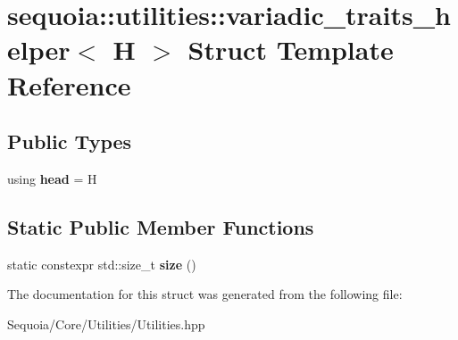 \hypertarget{structsequoia_1_1utilities_1_1variadic__traits__helper_3_01_h_01_4}{}\section{sequoia\+::utilities\+::variadic\+\_\+traits\+\_\+helper$<$ H $>$ Struct Template Reference}
\label{structsequoia_1_1utilities_1_1variadic__traits__helper_3_01_h_01_4}
\subsection*{Public Types}
\begin{DoxyCompactItemize}
\item 
\mbox{\label{structsequoia_1_1utilities_1_1variadic__traits__helper_3_01_h_01_4_a64f4c7c02872760d5f56bbcd8e4eb855}} 
using {\bfseries head} = H
\end{DoxyCompactItemize}
\subsection*{Static Public Member Functions}
\begin{DoxyCompactItemize}
\item 
\mbox{\label{structsequoia_1_1utilities_1_1variadic__traits__helper_3_01_h_01_4_a1216ff32cef0736473ea95de81710c9f}} 
static constexpr std\+::size\+\_\+t {\bfseries size} ()
\end{DoxyCompactItemize}


The documentation for this struct was generated from the following file\+:\begin{DoxyCompactItemize}
\item 
Sequoia/\+Core/\+Utilities/Utilities.\+hpp\end{DoxyCompactItemize}
